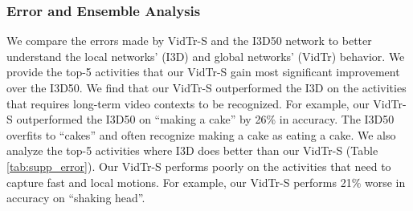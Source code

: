 \documentclass[10pt,twocolumn,letterpaper]{article}
\begin{document}
\subsubsection{Error and Ensemble Analysis}
\begin{table}[t!]
\footnotesize
     \hfill
	\caption{ Quantitative analysis on Kinetics-400 dataset. The performance gain is defined as the disparity of the top-1 accuracy between VidTr network and that of I3D.}
	\label{tab:supp_error}
\end{table}
We compare the errors made by VidTr-S and the I3D50 network to better understand the local networks' (I3D) and global networks' (VidTr) behavior. We provide the top-5 activities that our VidTr-S gain most significant improvement over the I3D50. We find that our VidTr-S outperformed the I3D on the activities that requires long-term video contexts to be recognized. For example, our VidTr-S outperformed the I3D50 on ``making a cake'' by 26\% in accuracy. The I3D50 overfits to ``cakes'' and often recognize making a cake as eating a cake. We also analyze the top-5 activities where I3D does better than our VidTr-S (Table \ref{tab:supp_error}). Our VidTr-S performs poorly on the activities that need to capture fast and local motions. For example, our VidTr-S performs 21\% worse in accuracy on ``shaking head''. 
\end{document}
